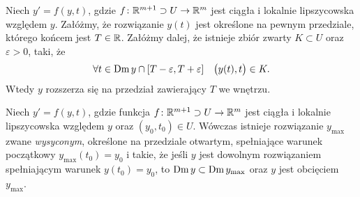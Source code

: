 \begin{theorem} \label{T: TOPK}
  Niech $y' = f(y,t)$, gdzie $f \colon \R^{m+1} \supset U \to \R^m$ jest ciągła i lokalnie lipszycowska względem $y$. 
  Załóżmy, że rozwiązanie $y(t)$ jest określone na pewnym przedziale, którego końcem jest $T \in \R$. Załóżmy dalej, że 
  istnieje zbiór zwarty $K \subset U$ oraz $\varepsilon > 0$, taki, że
%
  \begin{equation*}
    \forall t \in \domain y \cap [T - \varepsilon, T + \varepsilon] \quad \p[\big]{y(t), t} \in K.
  \end{equation*}
%
  Wtedy $y$ rozszerza się na przedział zawierający $T$ we wnętrzu.
\end{theorem}
%
\begin{theorem}
  Niech $y' = f(y,t)$, gdzie funkcja $f \colon \R^{m+1} \supset U \to \R^m$ jest ciągła i lokalnie lipszycowska 
  względem $y$ oraz $(y_0, t_0) \in U$. Wówczas istnieje rozwiązanie $y_{\mathrm{max}}$ zwane \emph{wysyconym}, 
  określone na przedziale otwartym, spełniające warunek początkowy $y_{\mathrm{max}}(t_0)= y_0$ i takie, że jeśli $y$ 
  jest dowolnym rozwiązaniem spełniającym warunek $y(t_0) = y_0$, to $\domain y \subset \domain y_{\mathrm{max}}$ oraz 
  $y$ jest obcięciem $y_{\mathrm{max}}$.
\end{theorem}
































